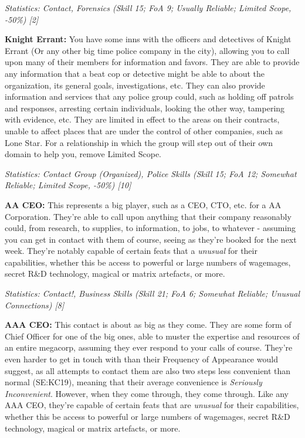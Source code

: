 \begin{multicols}{2}
	\textit{\textcolor{OliveGreen}{Statistics: Contact, Forensics (Skill 15; FoA 9; Usually Reliable; Limited Scope, -50\%) [2]}}
	
	\textbf{Knight Errant:} You have some inns with the officers and detectives of Knight Errant (Or any other big time police company in the city), allowing you to call upon many of their members for information and favors. They are able to provide any information that a beat cop or detective might be able to about the organization, its general goals, investigations, etc. They can also provide information and services that any police group could, such as holding off patrols and responses, arresting certain individuals, looking the other way, tampering with evidence, etc. They are limited in effect to the areas on their contracts, unable to affect places that are under the control of other companies, such as Lone Star. For a relationship in which the group will step out of their own domain to help you, remove Limited Scope.
	
	\textit{\textcolor{OliveGreen}{Statistics: Contact Group (Organized), Police Skills (Skill 15; FoA 12; Somewhat Reliable; Limited Scope, -50\%) [10]}}
	
	\textbf{AA CEO:} This represents a big player, such as a CEO, CTO, etc. for a AA Corporation. They're able to call upon anything that their company reasonably could, from research, to supplies, to information, to jobs, to whatever - assuming you can get in contact with them of course, seeing as they're booked for the next week. They're notably capable of certain feats that a \textit{unusual} for their capabilities, whether this be access to powerful or large numbers of wagemages, secret R\&D technology, magical or matrix artefacts, or more.
	
	\textit{\textcolor{OliveGreen}{Statistics: Contact!, Business Skills (Skill 21; FoA 6; Somewhat Reliable; Unusual Connections) [8]}}
	
	\textbf{AAA CEO:} This contact is about as big as they come. They are some form of Chief Officer for one of the big ones, able to muster the expertise and resources of an entire megacorp, assuming they ever respond to your calls of course. They're even harder to get in touch with than their Frequency of Appearance would suggest, as all attempts to contact them are also two steps less convenient than normal (SE:KC19), meaning that their average convenience is \textit{Seriously Inconvenient}. However, when they come through, they come through. Like any AAA CEO, they're capable of certain feats that are \textit{unusual} for their capabilities, whether this be access to powerful or large numbers of wagemages, secret R\&D technology, magical or matrix artefacts, or more.
	

\end{multicols}
